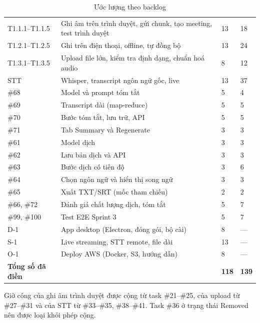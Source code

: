 \documentclass[12pt,a4paper]{report}
\begin{document}
\begin{table}[htbp]
  \centering
  \caption{Ước lượng theo backlog}
  \label{tab:estimate}
  \small
  \begin{tabularx}{\linewidth}{@{}P{2.6cm}LQ{1.6cm}Q{2.6cm}@{}}
    \toprule
     &  &  &  \\
    \midrule
    T1.1.1--T1.1.5 & Ghi âm trên trình duyệt, gửi chunk, tạo meeting, test trình duyệt & 13 & 18 \\
    T1.2.1--T1.2.5 & Ghi trên điện thoại, offline, tự đồng bộ & 13 & 24 \\
    T1.3.1--T1.3.5 & Upload file lớn, kiểm tra định dạng, chuẩn hoá audio & 8 & 12 \\
    STT & Whisper, transcript ngôn ngữ gốc, live & 13 & 37 \\
    \midrule
    \#68 & Model và prompt tóm tắt & 5 & 4 \\
    \#69 & Transcript dài (map-reduce) & 5 & 5 \\
    \#70 & Bước tóm tắt, lưu trữ, API & 5 & 5 \\
    \#71 & Tab Summary và Regenerate & 3 & 3 \\
    \#61 & Model dịch & 3 & 3 \\
    \#62 & Lưu bản dịch và API & 3 & 3 \\
    \#63 & Bước dịch có tiến độ & 3 & 6 \\
    \#64 & Chọn ngôn ngữ và hiển thị song ngữ & 3 & 3 \\
    \#65 & Xuất TXT/SRT (mốc tham chiếu) & 2 & 2 \\
    \#66, \#72 & Đánh giá chất lượng dịch, tóm tắt & 5 & 7 \\
    \#99, \#100 & Test E2E Sprint 3 & 5 & 7 \\
    \midrule
    D-1 & App desktop (Electron, đóng gói, bộ cài) & 8 & --- \\
    S-1 & Live streaming, STT remote, file dài & 13 & --- \\
    O-1 & Deploy AWS (Docker, S3, hướng dẫn) & 8 & --- \\
    \midrule
    \textbf{Tổng số đã điền} & & \textbf{118} & \textbf{139} \\
    \bottomrule
  \end{tabularx}
\end{table}

Giờ công của ghi âm trình duyệt được cộng từ task \#21--\#25, của upload từ \#27--\#31 và của STT từ
\#33--\#35, \#38--\#41. Task \#36 ở trạng thái Removed nên được loại khỏi phép cộng.
\end{document}
